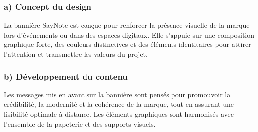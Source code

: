 \subsubsection*{a) Concept du design}
La bannière SayNote est conçue pour renforcer la présence visuelle de la marque lors d’événements ou dans des espaces digitaux. Elle s’appuie sur une composition graphique forte, des couleurs distinctives et des éléments identitaires pour attirer l’attention et transmettre les valeurs du projet.

\subsubsection*{b) Développement du contenu}
Les messages mis en avant sur la bannière sont pensés pour promouvoir la crédibilité, la modernité et la cohérence de la marque, tout en assurant une lisibilité optimale à distance. Les éléments graphiques sont harmonisés avec l’ensemble de la papeterie et des supports visuels.

